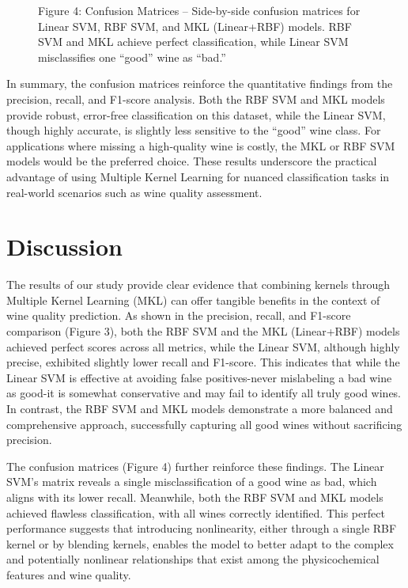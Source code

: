 \documentclass[11pt]{article}
\begin{document}
\begin{figure}[h]
\begin{center}
\end{center}
\caption{Figure 4: Confusion Matrices – Side-by-side confusion matrices for Linear SVM, RBF SVM, and MKL (Linear+RBF) models. RBF SVM and MKL achieve perfect classification, while Linear SVM misclassifies one “good” wine as “bad.”}
\label{experiment1fitness}
\end{figure}
 
In summary, the confusion matrices reinforce the quantitative findings from the precision, recall, and F1-score analysis. Both the RBF SVM and MKL models provide robust, error-free classification on this dataset, while the Linear SVM, though highly accurate, is slightly less sensitive to the “good” wine class. For applications where missing a high-quality wine is costly, the MKL or RBF SVM models would be the preferred choice. These results underscore the practical advantage of using Multiple Kernel Learning for nuanced classification tasks in real-world scenarios such as wine quality assessment.

\section{Discussion}

The results of our study provide clear evidence that combining kernels through Multiple Kernel Learning (MKL) can offer tangible benefits in the context of wine quality prediction. As shown in the precision, recall, and F1-score comparison (Figure 3), both the RBF SVM and the MKL (Linear+RBF) models achieved perfect scores across all metrics, while the Linear SVM, although highly precise, exhibited slightly lower recall and F1-score. This indicates that while the Linear SVM is effective at avoiding false positives-never mislabeling a bad wine as good-it is somewhat conservative and may fail to identify all truly good wines. In contrast, the RBF SVM and MKL models demonstrate a more balanced and comprehensive approach, successfully capturing all good wines without sacrificing precision.

The confusion matrices (Figure 4) further reinforce these findings. The Linear SVM’s matrix reveals a single misclassification of a good wine as bad, which aligns with its lower recall. Meanwhile, both the RBF SVM and MKL models achieved flawless classification, with all wines correctly identified. This perfect performance suggests that introducing nonlinearity, either through a single RBF kernel or by blending kernels, enables the model to better adapt to the complex and potentially nonlinear relationships that exist among the physicochemical features and wine quality.
\end{document}
